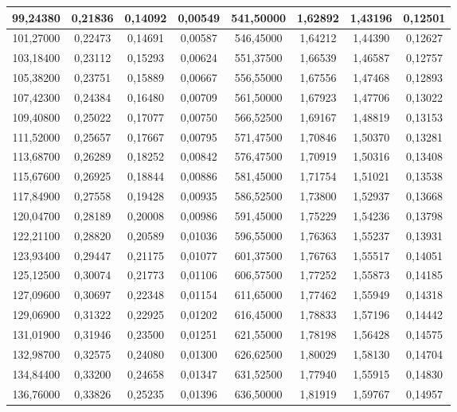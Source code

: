 \documentclass[a4paper,12pt]{article}
\numberwithin{equation}{section}
\begin{document}
\begin{appendices}
\begin{longtable}[c]{|c|c|c|c|c|c|c|c|}
99,24380	&	0,21836	&	0,14092	&	0,00549	&	541,50000	&	1,62892	&	1,43196	&	0,12501	\\\hline
101,27000	&	0,22473	&	0,14691	&	0,00587	&	546,45000	&	1,64212	&	1,44390	&	0,12627	\\\hline
103,18400	&	0,23112	&	0,15293	&	0,00624	&	551,37500	&	1,66539	&	1,46587	&	0,12757	\\\hline
105,38200	&	0,23751	&	0,15889	&	0,00667	&	556,55000	&	1,67556	&	1,47468	&	0,12893	\\\hline
107,42300	&	0,24384	&	0,16480	&	0,00709	&	561,50000	&	1,67923	&	1,47706	&	0,13022	\\\hline
109,40800	&	0,25022	&	0,17077	&	0,00750	&	566,52500	&	1,69167	&	1,48819	&	0,13153	\\\hline
111,52000	&	0,25657	&	0,17667	&	0,00795	&	571,47500	&	1,70846	&	1,50370	&	0,13281	\\\hline
113,68700	&	0,26289	&	0,18252	&	0,00842	&	576,47500	&	1,70919	&	1,50316	&	0,13408	\\\hline
115,67600	&	0,26925	&	0,18844	&	0,00886	&	581,45000	&	1,71754	&	1,51021	&	0,13538	\\\hline
117,84900	&	0,27558	&	0,19428	&	0,00935	&	586,52500	&	1,73800	&	1,52937	&	0,13668	\\\hline
120,04700	&	0,28189	&	0,20008	&	0,00986	&	591,45000	&	1,75229	&	1,54236	&	0,13798	\\\hline
122,21100	&	0,28820	&	0,20589	&	0,01036	&	596,55000	&	1,76363	&	1,55237	&	0,13931	\\\hline
123,93400	&	0,29447	&	0,21175	&	0,01077	&	601,37500	&	1,76763	&	1,55517	&	0,14051	\\\hline
125,12500	&	0,30074	&	0,21773	&	0,01106	&	606,57500	&	1,77252	&	1,55873	&	0,14185	\\\hline
127,09600	&	0,30697	&	0,22348	&	0,01154	&	611,65000	&	1,77462	&	1,55949	&	0,14318	\\\hline
129,06900	&	0,31322	&	0,22925	&	0,01202	&	616,45000	&	1,78833	&	1,57196	&	0,14442	\\\hline
131,01900	&	0,31946	&	0,23500	&	0,01251	&	621,55000	&	1,78198	&	1,56428	&	0,14575	\\\hline
132,98700	&	0,32575	&	0,24080	&	0,01300	&	626,62500	&	1,80029	&	1,58130	&	0,14704	\\\hline
134,84400	&	0,33200	&	0,24658	&	0,01347	&	631,52500	&	1,77940	&	1,55915	&	0,14830	\\\hline
136,76000	&	0,33826	&	0,25235	&	0,01396	&	636,50000	&	1,81919	&	1,59767	&	0,14957	\\\hline

\end{longtable}
\end{appendices}
\end{document}
